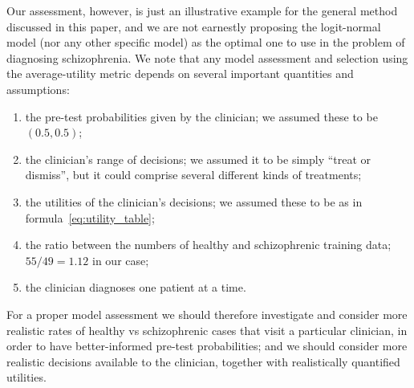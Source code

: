 \documentclass[%
]{frontiersSCNS-nologo} %
\renewcommand*{\|}{\mathpunct{|}}%
\begin{document}
Our assessment, however, is just an illustrative example for the general
method discussed in this paper, and we are not earnestly proposing the
logit-normal model (nor any other specific model) as the optimal one to use in the
problem of diagnosing schizophrenia. We note that any model assessment and selection using the average-utility metric depends on several important quantities and
assumptions:
\begin{enumerate}[label=\Alph*.]
\item the pre-test probabilities given by the clinician; we assumed these
  to be $(0.5, 0.5)$;
\item the clinician's range of decisions; we assumed it to be simply
  \enquote{treat or dismiss}, but it could comprise several different
  kinds of treatments;
\item the utilities of the  clinician's decisions; we assumed these to be as
  in formula~\eqref{eq:utility_table};
\item the ratio between the numbers of healthy and schizophrenic training
  data; $55/49=1.12$ in our case;
\item\label{item:order_important}the clinician diagnoses one patient at a time.
\end{enumerate}

For a proper model assessment we should therefore investigate and consider
more realistic rates of healthy vs schizophrenic cases that visit a
particular clinician, in order to have better-informed pre-test
probabilities; and we should consider more realistic decisions available to
the clinician, together with realistically quantified utilities.

\medskip
\end{document}
